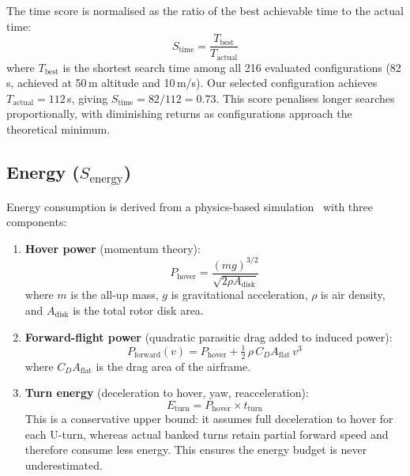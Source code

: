 \documentclass[10pt,a4paper]{article}
\begin{document}
The time score is normalised as the ratio of the best achievable time to the actual time:
\begin{equation}\label{eq:time-score}
  S_\text{time} = \frac{T_\text{best}}{T_\text{actual}}
\end{equation}
where $T_\text{best}$ is the shortest search time among all 216 evaluated configurations (82\,s, achieved at 50\,m altitude and 10\,m/s). Our selected configuration achieves $T_\text{actual} = 112$\,s, giving $S_\text{time} = 82/112 = 0.73$. This score penalises longer searches proportionally, with diminishing returns as configurations approach the theoretical minimum.

\subsection{Energy (\texorpdfstring{$S_\text{energy}$}{S\_energy})}\label{sec:score-energy}

Energy consumption is derived from a physics-based simulation~\citep{stolaroff2018energy} with three components:

\begin{enumerate}[nosep]
  \item \textbf{Hover power} (momentum theory):
  \begin{equation}
    P_\text{hover} = \frac{(mg)^{3/2}}{\sqrt{2 \rho A_\text{disk}}}
  \end{equation}
  where $m$ is the all-up mass, $g$ is gravitational acceleration, $\rho$ is air density, and $A_\text{disk}$ is the total rotor disk area.

  \item \textbf{Forward-flight power} (quadratic parasitic drag added to induced power):
  \begin{equation}
    P_\text{forward}(v) = P_\text{hover} + \tfrac{1}{2}\,\rho\,C_D A_\text{flat}\,v^3
  \end{equation}
  where $C_D A_\text{flat}$ is the drag area of the airframe.

  \item \textbf{Turn energy} (deceleration to hover, yaw, reacceleration):
  \begin{equation}
    E_\text{turn} = P_\text{hover} \times t_\text{turn}
  \end{equation}
  This is a conservative upper bound: it assumes full deceleration to hover for each U-turn, whereas actual banked turns retain partial forward speed and therefore consume less energy. This ensures the energy budget is never underestimated.
\end{enumerate}
\end{document}
